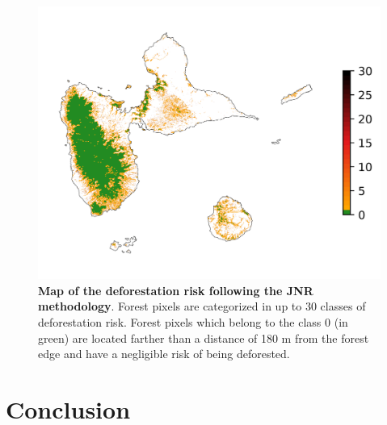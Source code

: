 \documentclass[paper=a4, 12pt, DIV=12]{scrartcl}
\begin{document}
\begin{figure}[H]
\centering
\includegraphics[width=0.8\linewidth]{outputs/endval/riskmap_ws5_ei_ev.png}
\caption{\label{fig:orgb34817e}\textbf{Map of the deforestation risk following the JNR methodology}. Forest pixels are categorized in up to 30 classes of deforestation risk. Forest pixels which belong to the class 0 (in green) are located farther than a distance of 180 m from the forest edge and have a negligible risk of being deforested.}
\end{figure}

\section{Conclusion}
\label{sec:org979b28c}
\end{document}
